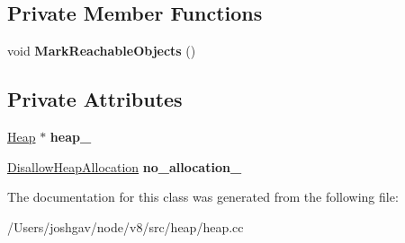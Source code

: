 \subsection*{Private Member Functions}
\begin{DoxyCompactItemize}
\item 
void {\bfseries Mark\+Reachable\+Objects} ()\hypertarget{classv8_1_1internal_1_1_unreachable_objects_filter_a66ca4945ccc617954c605301ad6aed93}{}\label{classv8_1_1internal_1_1_unreachable_objects_filter_a66ca4945ccc617954c605301ad6aed93}

\end{DoxyCompactItemize}
\subsection*{Private Attributes}
\begin{DoxyCompactItemize}
\item 
\hyperlink{classv8_1_1internal_1_1_heap}{Heap} $\ast$ {\bfseries heap\+\_\+}\hypertarget{classv8_1_1internal_1_1_unreachable_objects_filter_aa95462dc89ab21f9319be27614ab60a4}{}\label{classv8_1_1internal_1_1_unreachable_objects_filter_aa95462dc89ab21f9319be27614ab60a4}

\item 
\hyperlink{classv8_1_1internal_1_1_per_thread_assert_scope_debug_only}{Disallow\+Heap\+Allocation} {\bfseries no\+\_\+allocation\+\_\+}\hypertarget{classv8_1_1internal_1_1_unreachable_objects_filter_af53b7ce7ad03bf3508744ae6e8825e55}{}\label{classv8_1_1internal_1_1_unreachable_objects_filter_af53b7ce7ad03bf3508744ae6e8825e55}

\end{DoxyCompactItemize}


The documentation for this class was generated from the following file\+:\begin{DoxyCompactItemize}
\item 
/\+Users/joshgav/node/v8/src/heap/heap.\+cc\end{DoxyCompactItemize}
